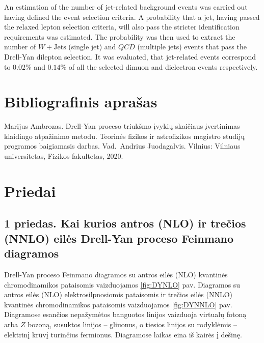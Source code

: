 \documentclass[a4paper, 12pt, oneside]{article}
\newcommand{\WJets}{W\! +\!\mathrm{Jets}}
\newcommand{\QCD}{QC\! D}
\newlength\q
\begin{document}
An estimation of the number of jet-related background events was carried out having defined the event selection criteria.
A probability that a jet, having passed the relaxed lepton selection criteria, will also pass the stricter
identification requirements was estimated.
The probability was then used to extract the number of $\WJets$ (single jet) and $\QCD$ (multiple jets)
events that pass the Drell-Yan dilepton selection.
It was evaluated, that jet-related events correspond to $0.02\%$ and $0.14\%$ of all the selected dimuon and dielectron
events respectively.


\newpage
\section*{Bibliografinis aprašas}
Marijus Ambrozas. Drell-Yan proceso triukšmo įvykių skaičiaus įvertinimas klaidingo atpažinimo metodu.
Teorinės fizikos ir astrofizikos magistro studijų programos baigiamasis darbas.
Vad.\ Andrius Juodagalvis. Vilnius: Vilniaus universitetas, Fizikos fakultetas, 2020.


\newpage
\section*{Priedai} 

\subsection*{1 priedas. Kai kurios antros (NLO) ir trečios (NNLO) eilės Drell-Yan proceso Feinmano diagramos}
Drell-Yan proceso Feinmano diagramos su antros eilės (NLO) kvantinės chromodinamikos pataisomis vaizduojamos \ref{fig:DYNLO} pav.
Diagramos su antros eilės (NLO) elektrosilpnosiomis pataisomis ir trečios eilės (NNLO) kvantinės chromodinamikos pataisomis
vaizduojamos \ref{fig:DYNNLO} pav.
Diagramose esančios nepažymėtos banguotos linijos vaizduoja virtualų fotoną arba $Z$ bozoną, susuktos linijos -- gliuonus, o
tiesios linijos su rodyklėmis -- elektrinį krūvį turinčius fermionus.
Diagramose laikas eina iš kairės į dešinę.
\end{document}
